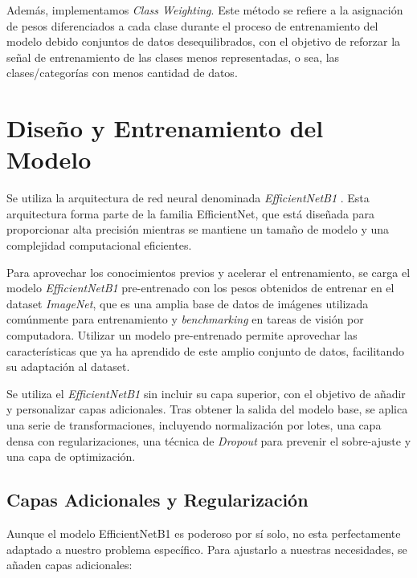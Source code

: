 Además, implementamos \textit{Class Weighting}. Este método se refiere a la asignación de pesos diferenciados a cada clase 
durante el proceso de entrenamiento del modelo debido conjuntos de datos desequilibrados, con el objetivo de reforzar la señal 
de entrenamiento de las clases menos representadas, o sea, las clases/categorías con menos cantidad de datos.

\section{Diseño y Entrenamiento del Modelo}

Se utiliza la arquitectura de red neural denominada \textit{EfficientNetB1} \cite{efficientnet} . Esta arquitectura forma parte de la familia EfficientNet, 
que está diseñada para proporcionar alta precisión mientras se mantiene un tamaño de modelo y una complejidad computacional 
eficientes.

Para aprovechar los conocimientos previos y acelerar el entrenamiento, se carga el modelo \textit{EfficientNetB1} pre-entrenado 
con los pesos obtenidos de entrenar en el dataset \textit{ImageNet}, que es una amplia base de datos de imágenes utilizada comúnmente 
para entrenamiento y \textit{benchmarking} en tareas de visión por computadora. Utilizar un modelo pre-entrenado permite aprovechar 
las características que ya ha aprendido de este amplio conjunto de datos, facilitando su adaptación al dataset.

Se utiliza el \textit{EfficientNetB1} sin incluir su capa superior, con el objetivo de añadir y personalizar capas adicionales. 
Tras obtener la salida del modelo base, se aplica una serie de transformaciones, incluyendo normalización por lotes, una capa 
densa con regularizaciones, una técnica de \textit{Dropout} para prevenir el sobre-ajuste y 
una capa de optimización. 

\subsection{Capas Adicionales y Regularización}

Aunque el modelo EfficientNetB1 es poderoso por sí solo, no esta perfectamente adaptado a nuestro problema específico. 
Para ajustarlo a nuestras necesidades, se añaden capas adicionales:

